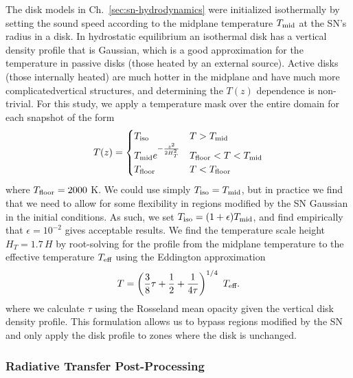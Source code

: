 The disk models in Ch.~\ref{sec:sn-hydrodynamics} were initialized isothermally by setting the sound speed according to the midplane temperature $T_\text{mid}$ at the SN's radius in a \citet{SirkoGoodman03} disk.
In hydrostatic equilibrium an isothermal disk has a vertical density profile that is Gaussian, which is a good approximation for the temperature in passive disks (those heated by an external source).
Active disks (those internally heated) are much hotter in the midplane and have much more complicatedvertical structures, and determining the $T(z)$ dependence is non-trivial.
For this study, we apply a temperature mask over the entire domain for each snapshot of the form
\begin{equation}
\label{eqn:temp-profile}
    T(z) =
    \begin{cases}
	T_\text{iso} & T>T_\text{mid} \\
	T_\text{mid} e^{- \frac{z^2}{2 H_T^2}} & T_\text{floor} < T < T_\text{mid} \\
	T_\text{floor} & T<T_\text{floor}
    \end{cases}
\end{equation}
where $T_\text{floor}=2000$ K.
We could use simply $T_\text{iso} = T_\text{mid}$, but in practice we find that we need to allow for some flexibility in regions modified by the SN Gaussian in the initial conditions.
As such, we set $T_\text{iso} = (1+\epsilon) T_\text{mid}$, and find empirically that $\epsilon=10^{-2}$ gives acceptable results.
We find the temperature scale height $H_T=1.7\,H$ by root-solving for the profile from the midplane temperature to the effective temperature $T_\text{eff}$ using the Eddington approximation
\begin{equation}
	T = \left( \frac{3}{8} \tau + \frac{1}{2} + \frac{1}{4\tau} \right)^{1/4}\ \Teff.
\end{equation}
where we calculate $\tau$ using the Rosseland mean opacity given the vertical disk density profile.
This formulation allows us to bypass regions modified by the SN and only apply the disk profile to zones where the disk is unchanged.



%
%
\subsubsection{Radiative Transfer Post-Processing} \label{subsec:rad-transfer}


